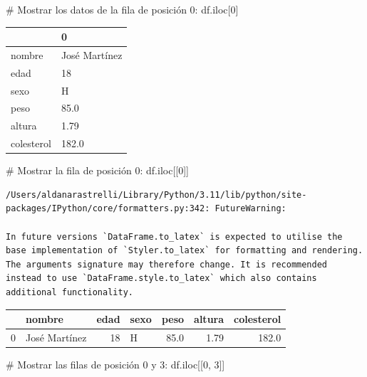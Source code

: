 \documentclass[
  letterpaper,
  DIV=11,
  numbers=noendperiod]{scrreprt}
\newenvironment{Shaded}{\begin{snugshade}}{\end{snugshade}}
\newcommand{\CommentTok}[1]{\textcolor[rgb]{0.37,0.37,0.37}{#1}}
\newcommand{\DecValTok}[1]{\textcolor[rgb]{0.68,0.00,0.00}{#1}}
\newcommand{\NormalTok}[1]{\textcolor[rgb]{0.00,0.23,0.31}{#1}}
\begin{document}
\begin{Shaded}
\begin{Highlighting}[]
\CommentTok{\# Mostrar los datos de la fila de posición 0:}
\NormalTok{df.iloc[}\DecValTok{0}\NormalTok{]}
\end{Highlighting}
\end{Shaded}

\begin{tabular}{ll}
\toprule
{} &              0 \\
\midrule
nombre     &  José Martínez \\
edad       &             18 \\
sexo       &              H \\
peso       &           85.0 \\
altura     &           1.79 \\
colesterol &          182.0 \\
\bottomrule
\end{tabular}

\begin{Shaded}
\begin{Highlighting}[]
\CommentTok{\# Mostrar la fila de posición 0:}
\NormalTok{df.iloc[[}\DecValTok{0}\NormalTok{]]}
\end{Highlighting}
\end{Shaded}

\begin{verbatim}
/Users/aldanarastrelli/Library/Python/3.11/lib/python/site-packages/IPython/core/formatters.py:342: FutureWarning:

In future versions `DataFrame.to_latex` is expected to utilise the base implementation of `Styler.to_latex` for formatting and rendering. The arguments signature may therefore change. It is recommended instead to use `DataFrame.style.to_latex` which also contains additional functionality.
\end{verbatim}

\begin{tabular}{llrlrrr}
\toprule
{} &         nombre &  edad & sexo &  peso &  altura &  colesterol \\
\midrule
0 &  José Martínez &    18 &    H &  85.0 &    1.79 &       182.0 \\
\bottomrule
\end{tabular}

\begin{Shaded}
\begin{Highlighting}[]
\CommentTok{\# Mostrar las filas de posición 0 y 3:}
\NormalTok{df.iloc[[}\DecValTok{0}\NormalTok{, }\DecValTok{3}\NormalTok{]]}
\end{Highlighting}
\end{Shaded}
\end{document}
